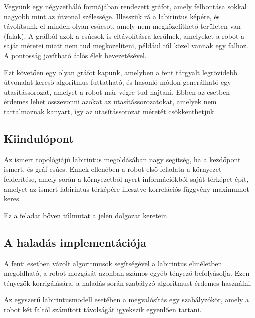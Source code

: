 Vegyünk egy négyzetháló formájában rendezett gráfot, amely felbontása sokkal
nagyobb mint az útvonal szélessége. Illesszük rá a labirintus képére, és
távolítsunk el minden olyan csúcsot, amely nem megközelíthető területen van
(falak). A gráfból azok a csúcsok is eltávolításra kerülnek, amelyeket a robot a
saját méretei miatt nem tud megközelíteni, például túl közel vannak egy falhoz.
A pontosság javítható átlós élek bevezetésével.

Ezt követően egy olyan gráfot kapunk, amelyben a fent tárgyalt legrövidebb
útvonalat kereső algoritmus futtatható, és hasonló módon generálható egy
utasítássorozat, amelyet a robot már végre tud hajtani. Ebben az esetben érdemes
lehet összevonni azokat az utasítássorozatokat, amelyek nem tartalmaznak kanyart,
így az utasítássorozat méretét csökkenthetjük.

\subsection{Kiindulópont}

Az ismert topológiájú labirintus megoldásában nagy segítség, ha a kezdőpont
ismert, és gráf csúcs. Ennek ellenében a robot első feladata a környezet
felderítése, amely során a környezetből nyert információkból saját térképet épít,
amelyet az ismert labirintus térképére illesztve korrelációs függvény maximumot
keres.

Ez a feladat bőven túlmutat a jelen dolgozat keretein.

\subsection{A haladás implementációja}

A fenti esetben vázolt algoritmusok segítségével a labirintus elméletben
megoldható, a robot mozgását azonban számos egyéb tényező befolyásolja. Ezen
tényezők korrigálására, a haladás során szabályzó algoritmust érdemes használni.

Az egyszerű labirintusmodell esetében a megvalósítás egy szabályzókör, amely a
robot két faltól számított távolságát igyekszik egyenlően tartani.


